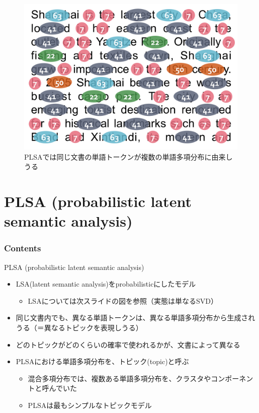 \documentclass[aspectratio=169,unicode,dvipdfmx,14pt]{beamer}
\begin{document}
\begin{frame}
\begin{figure}[htbp]
\begin{center}
\includegraphics[scale=.22]{PLSI2.jpg}
\vspace{-.2in}
\caption{PLSAでは同じ文書の単語トークンが複数の単語多項分布に由来しうる}
\label{}
\end{center}
\end{figure}
\end{frame}

\section{PLSA (probabilistic latent semantic analysis)}

\begin{frame}\frametitle{Contents}
\Large \tableofcontents[currentsection]
\end{frame}

\begin{frame}{PLSA (probabilistic latent semantic analysis)}
\begin{itemize}
\item LSA(latent semantic analysis)をprobabilisticにしたモデル
\begin{itemize}
\item LSAについては次スライドの図を参照（実態は単なるSVD）
\end{itemize}
\item 同じ文書内でも、異なる単語トークンは、異なる単語多項分布から生成されうる（＝異なるトピックを表現しうる）
\item どのトピックがどのくらいの確率で使われるかが、文書によって異なる
\item PLSAにおける単語多項分布を、トピック(topic)と呼ぶ
\begin{itemize}
\item 混合多項分布では、複数ある単語多項分布を、クラスタやコンポーネントと呼んでいた
\item PLSAは最もシンプルなトピックモデル
\end{itemize}
\end{itemize}
\end{frame}
\end{document}
